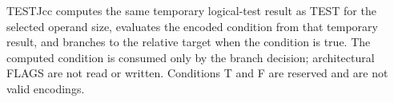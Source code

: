 TESTJcc computes the same temporary logical-test result as TEST for the selected operand size, evaluates the encoded condition from that temporary result, and branches to the relative target when the condition is true. The computed condition is consumed only by the branch decision; architectural FLAGS are not read or written. Conditions T and F are reserved and are not valid encodings.
